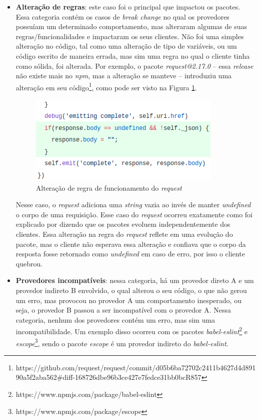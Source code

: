 \begin{itemize}
    \item \textbf{Alteração de regras}: este caso foi o principal que impactou os pacotes. Essa categoria contém os casos de \textit{break change} no qual os provedores possuíam um determinado comportamento, mas alteraram algumas de suas regras/funcionalidades e impactaram os seus clientes. Não foi uma simples alteração no código, tal como uma alteração de tipo de variáveis, ou um código escrito de maneira errada, mas sim uma regra no qual o cliente tinha como sólida, foi alterada. Por exemplo, o pacote \textit{request@2.17.0} -- essa \textit{release} não existe mais no \textit{npm}, mas a alteração se manteve -- introduziu uma alteração em seu código\footnote{https://github.com/request/request/commit/d05b6ba72702c2411b4627d4d89190a5f2aba562\#diff-168726dbe96b3ce427e7fedce31bb0bcR857}, como pode ser visto na Figura \ref{fig:bc_category_change_rule_1}.

    \begin{figure}
        \centering
        \includegraphics[scale=0.6]{figuras/bc_category_change_rule_1.png}
        \caption{Alteração de regra de funcionamento do \textit{request}}
        \label{fig:bc_category_change_rule_1}
    \end{figure}{}

    Nesse caso, o \textit{request} adiciona uma \textit{string} vazia ao invés de manter \textit{undefined} o corpo de uma requisição. Esse caso do \textit{request} ocorreu exatamente como foi explicado por  dizendo que os pacotes evoluem independentemente dos clientes. Essa alteração na regra do \textit{request} reflete em uma evolução do pacote, mas o cliente não esperava essa alteração e confiava que o corpo da resposta fosse retornado como \textit{undefined} em caso de erro, por isso o cliente quebrou.

    \item \textbf{Provedores incompatíveis}: nessa categoria, há um provedor direto A e um provedor indireto B envolvido, o qual alterou o seu código, o que não gerou um erro, mas provocou no provedor A um comportamento inesperado, ou seja, o provedor B passou a ser incompatível com o provedor A. Nessa categoria, nenhum dos provedores contém um erro, mas sim uma incompatibilidade. Um exemplo disso ocorreu com os pacotes \textit{babel-eslint}\footnote{https://www.npmjs.com/package/babel-eslint} e \textit{escope}\footnote{https://www.npmjs.com/package/escope}, sendo o pacote \textit{escope} é um provedor indireto do \textit{babel-eslint}.


\end{itemize}
